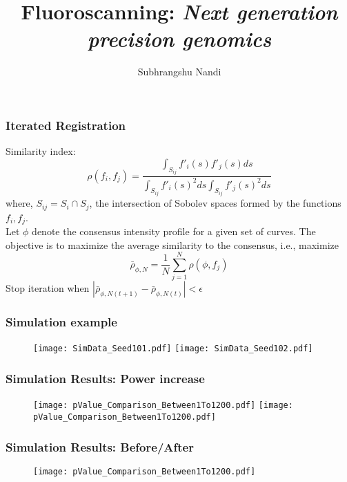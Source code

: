 \documentclass[10pt,dvipsnames,table]{beamer}
\title[Fluoroscanning]{Fluoroscanning: {\emph{Next generation precision genomics}}}
\author{Subhrangshu Nandi}
\begin{document}
\setlength{\baselineskip}{16truept}
\frame{\maketitle}

\begin{frame}
\frametitle{Iterated Registration}
Similarity index:
\[ \rho(f_i, f_j) = \frac{\int _{S_{ij}}f'_i(s)f'_j(s) ds}{\int _{S_{ij}}f'_i(s)^2 ds \int _{S_{ij}}f'_j(s)^2 ds} \]
where, $S_{ij} = S_i \cap S_j$, the intersection of Sobolev spaces formed by the functions $f_i, f_j$.\\

Let $\phi$ denote the consensus intensity profile for a given set of curves. The objective is to maximize the average similarity to the consensus, i.e., maximize
\[ \bar{\rho}_{\phi, N} = \frac{1}{N} \sum \limits_{j = 1}^{N} \rho(\phi, f_j)\]
Stop iteration when $|\bar{\rho}_{\phi, N (t+1)} - \bar{\rho}_{\phi, N (t)} | < \epsilon$
\end{frame}

\begin{frame}
\frametitle{Simulation example}
\begin{figure}
\begin{centering}
\texttt{[image: SimData\_Seed101.pdf]}
\texttt{[image: SimData\_Seed102.pdf]}
\end{centering}
\end{figure}
\end{frame}

\begin{frame}
\frametitle{Simulation Results: Power increase}
\begin{figure}
\begin{centering}
\texttt{[image: pValue\_Comparison\_Between1To1200.pdf]}
\texttt{[image: pValue\_Comparison\_Between1To1200.pdf]}
\end{centering}
\end{figure}
\end{frame}

\begin{frame}
\frametitle{Simulation Results: Before/After}
\begin{figure}
\begin{centering}
\texttt{[image: pValue\_Comparison\_Between1To1200.pdf]}
\end{centering}
\end{figure}
\end{frame}
\end{document}
